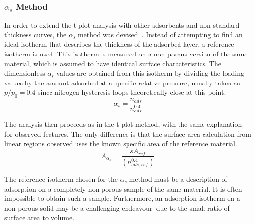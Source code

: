 \subsubsection{\(\alpha_s\) Method}\label{pyg:charac:alphasplot}

In order to extend the t-plot analysis with other adsorbents and
non-standard thickness curves, the \(\alpha_s\) method was
devised~\cite{atkinsonAdsorptivePropertiesMicroporous1984}.
Instead of attempting to find an ideal isotherm that describes the
thickness of the adsorbed layer, a reference isotherm is used.
This isotherm is measured on a non-porous version of the same material,
which is assumed to have identical surface characteristics.
The dimensionless \(\alpha_s\) values are obtained from this isotherm by
dividing the loading values by the amount adsorbed at a specific relative
pressure, usually taken as \(p/p_0=0.4\) since nitrogen hysteresis loops
theoretically close at this point.
%
\begin{equation}
	\alpha_s = \frac{n_{ads}}{n_{ads}^{0.4}}
\end{equation}

The analysis then proceeds as in the t-plot method, with the
same explanation for observed features. The only difference is
that the surface area calculation from linear regions observed
uses the known specific area of the reference material.
%
\begin{equation}
	A_{\alpha_s} = \frac{s A_{ref}}{{(n_{ads, ref}^{0.4})}}
\end{equation}

The reference isotherm chosen for the \(\alpha_s\) method must
be a description of adsorption on a completely non-porous sample
of the same material. It is often impossible to obtain such
a sample. Furthermore, an adsorption isotherm on a non-porous
solid may be a challenging endeavour, due to the small ratio
of surface area to volume.